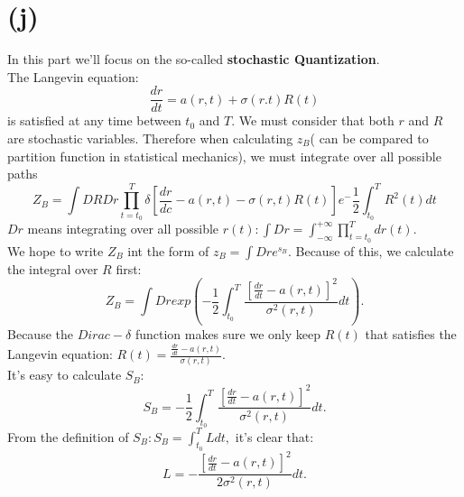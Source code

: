 \documentclass[12pt,a4paper]{paper}
\begin{document}
\section{(j)}
In this part we'll focus on the so-called \textbf{stochastic Quantization}.\\
\indent The Langevin equation:
\begin{equation}
\frac{dr}{dt}=a(r,t)+\sigma (r.t)R(t)
\end{equation}
is satisfied at any time between $t_{0}$ and $T$. We must consider that both $r$ and $R$ are stochastic variables. Therefore when calculating $z_{B}$( can be compared to partition function in statistical mechanics), we must integrate over all possible paths
\begin{equation}
Z_{B}=\int DRDr\prod_{t=t_{0}}^T \delta [\frac{dr}{dc}-a(r,t)-\sigma (r,t)R(t)]e^-\frac{1}{2}\int_{t_{0}}^{T}R^2 (t)dt
\end{equation}
$Dr$ means integrating over all possible $r(t): \int Dr=\int_{-\infty}^{+\infty} \prod_{t=t_{0}}^T dr(t)$.\\
\indent We hope to write $Z_{B}$ int the form of $z_{B}=\int Dre^{s_{B}}$. Because of this, we calculate the integral over $R$ first:
\begin{equation}
Z_{B}=\int Drexp(-\frac{1}{2}\int_{t_{0}}^T \frac{[\frac{dr}{dt}-a(r,t)]^2}{\sigma^2 (r,t)}dt).
\end{equation}
\indent Because the $Dirac-\delta$ function makes sure we only keep $R(t)$ that satisfies the Langevin equation: $R(t)=\frac{\frac{dr}{dt}-a(r,t)}{\sigma (r,t)}$.\\
\indent It's easy to calculate $S_{B}$:
\begin{equation}
S_{B}=-\frac{1}{2}\int_{t_{0}}^T \frac{[\frac{dr}{dt}-a(r,t)]^2}{\sigma^2 (r,t)}dt.
\end{equation}
\indent From the definition of $S_{B}:S_{B}=\int_{t_{0}}^T Ldt,$ it's clear that:
\begin{equation}
L=-\frac{[\frac{dr}{dt}-a(r,t)]^2}{2\sigma^2 (r,t)}dt.
\end{equation}
\end{document}
